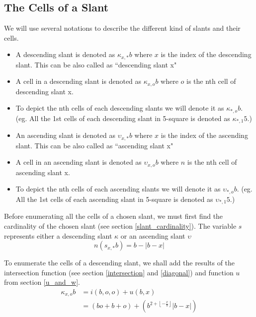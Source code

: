 \documentclass[letterpaper, twoside,12pt]{article}
\begin{document}
    \subsection{The Cells of a Slant} \label{cells_of_a_slant}
    We will use several notations to describe the different kind of slants and their cells.
    \begin{itemize}
        \item A descending slant is denoted as $\kappa_{x,*}b$ where $x$ is the index of the descending slant. This can be also called as ``descending slant x"
        \item A cell in a descending slant is denoted as $\kappa_{x,o}b$ where $o$ is the nth cell of descending slant x.
        \item To depict the nth cells of each descending slants we will denote it as $\kappa_{*,o}b$. (eg. All the 1st cells of each descending slant in 5-square is denoted as $\kappa_{*,1}5$.)
        \item An ascending slant is denoted as $\upsilon_{x,*}b$ where $x$ is the index of the ascending slant. This can be also called as ``ascending slant x"
        \item A cell in an ascending slant is denoted as $\upsilon_{x,o}b$ where $n$ is the nth cell of ascending slant x.
        \item To depict the nth cells of each ascending slants we will denote it as $\upsilon_{*,o}b$. (eg. All the 1st cells of each ascending slant in 5-square is denoted as $\upsilon_{*,1}5$.)
    \end{itemize}

    Before enumerating all the cells of a chosen slant, we must first find the cardinality of the chosen slant (see section \ref{slant_cardinality}). The variable $s$ represents either a descending slant $\kappa$ or an ascending slant $\upsilon$
    \begin{equation}
        n(s_{x,*}b) = b - |b-x|
    \end{equation}


    To enumerate the cells of a descending slant, we shall add the results of the intersection function (see section \ref{intersection} and \ref{diagonal}) and function $u$ from section \ref{u_and_w}.
    \begin{equation}
        \begin{split}
            \kappa_{x,o}b &= i(b,o,o) + u(b,x) \\
                &= (bo + b + o) + (b^{2 + \left\lfloor -\frac{x}{b} \right\rfloor }|b-x|)
        \end{split}
    \end{equation}
\end{document}
